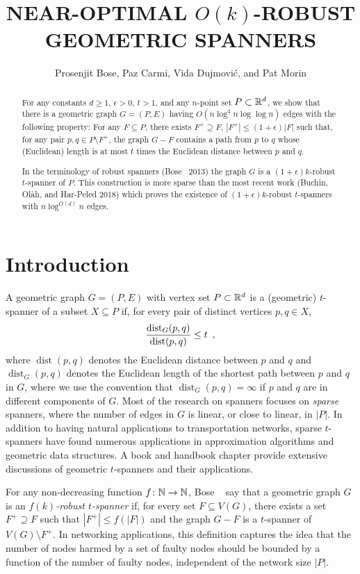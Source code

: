 \documentclass{patmorin}
\title{\MakeUppercase{Near-Optimal }$O(k)$-\MakeUppercase{Robust Geometric Spanners}}
\author{Prosenjit Bose, Paz Carmi, Vida Dujmovi\'c, and Pat Morin}
\date{\DTMnow}
\DeclareMathOperator{\dist}{dist}
\begin{document}
\maketitle


\begin{abstract}
  For any constants $d\ge 1$, $\epsilon >0$, $t>1$, and any $n$-point
  set $P\subset\mathbb{R}^d$, we show that there is a geometric graph $G=(P,E)$
  having $O(n\log^4 n\log\log n)$ edges with the following property:
  For any $F\subseteq P$, there exists $F^+\supseteq F$, $|F^+| \le
  (1+\epsilon)|F|$ such that, for any pair $p,q\in P\setminus F^+$,
  the graph $G-F$ contains a path from $p$ to $q$ whose (Euclidean)
  length is at most $t$ times the Euclidean distance between $p$ and $q$.
  
  In the terminology of robust spanners (Bose \etal\ 2013) the graph $G$
  is a $(1+\epsilon)k$-robust $t$-spanner of $P$. This construction is
  more sparse than the most recent work (Buchin, Ol\`ah, and Har-Peled 2018)
  which proves the existence of $(1+\epsilon)k$-robust $t$-spanners with
  $n\log^{O(d)} n$ edges.
\end{abstract}

\section{Introduction}

A geometric graph $G=(P,E)$ with vertex set $P\subset\mathbb{R}^d$ is a (geometric)
$t$-spanner of a subset $X\subseteq P$ if, for every pair of distinct vertices
$p,q\in X$, 
\begin{equation}
  \frac{\dist_G(p,q)}{\dist(p,q)} \le t \enspace , \eqlabel{spanning-ratio}
\end{equation}
where $\dist(p,q)$ denotes the Euclidean distance between $p$ and $q$ and
$\dist_G(p,q)$ denotes the Euclidean length of the shortest path between
$p$ and $q$ in $G$, where we use the convention that $\dist_G(p,q)=\infty$
if $p$ and $q$ are in different components of $G$.  Most of the research
on spanners focuses on \emph{sparse} spanners, where the number of edges
in $G$ is linear, or close to linear, in $|P|$.  In addition to having
natural applications to transportation networks, sparse $t$-spanners have
found numerous applications in approximation algorithms and geometric
data structures.
A book \cite{ns07} and handbook chapter \cite{e99} provide
extensive discussions of geometric $t$-spanners and their applications.

For any non-decreasing function $f\colon\mathbb{N}\to\mathbb{N}$, Bose \etal\
\cite{bose.dujmovic.ea:robust} say that a geometric graph $G$ is an
\emph{$f(k)$-robust $t$-spanner} if, for every set $F\subseteq V(G)$,
there exists a set $F^+\supseteq F$ such that $|F^+|\le f(|F|)$ and
the graph $G-F$ is a $t$-spanner of $V(G)\setminus F^+$.  In networking
applications, this definition captures the idea that the number of nodes
harmed by a set of faulty nodes should be bounded by a function of the
number of faulty nodes, independent of the network size $|P|$.
\end{document}
